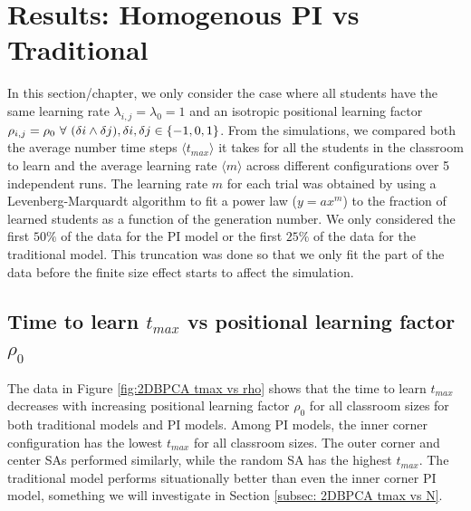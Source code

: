 \section{Results: Homogenous PI vs Traditional}
In this section/chapter, we only consider the case where all students have the same learning rate $\lambda_{i,j} = \lambda_0 = 1$ and an isotropic positional learning factor $\rho_{i,j} = \rho_0 \space ~\forall~ (\delta i \land \delta j),  \delta i, \delta j \in \lbrace -1,0,1 \rbrace $. From the simulations, we compared both the average number time steps $\langle t_{max} \rangle$ it takes for all the students in the classroom to learn and the average learning rate $\langle m \rangle$ across different configurations over 5 independent runs. The learning rate $m$ for each trial was obtained by using a Levenberg-Marquardt algorithm to fit a power law ($y = ax^m$) to the fraction of learned students as a function of the generation number. We only considered the first $50\%$ of the data for the PI model or the first $25\%$ of the data for the traditional model. This truncation was done so that we only fit the part of the data before the finite size effect starts to affect the simulation.

\subsection{Time to learn $t_{max}$ vs positional learning factor $\rho_0$} \label{subsec: 2DBPCA tmax vs rho}

The data in Figure \ref{fig:2DBPCA tmax vs rho} shows that the time to learn $t_{max}$ decreases with increasing positional learning factor $\rho_0$ for all classroom sizes for both traditional models and PI models. Among PI models, the inner corner configuration has the lowest $t_{max}$ for all classroom sizes. The outer corner and center SAs performed similarly, while the random SA has the highest $t_{max}$. The traditional model performs situationally better than even the inner corner PI model, something we will investigate in Section \ref{subsec: 2DBPCA tmax vs N}.


